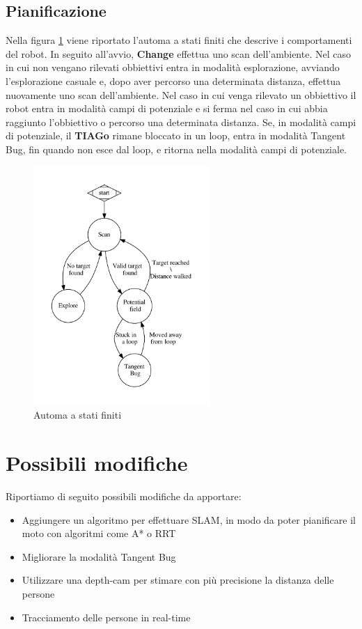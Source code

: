 \documentclass[a4paper]{article}
\begin{document}
	\subsection{Pianificazione}\label{subsec:Pianificazione}
	
	Nella figura \ref{fig:fsa} viene riportato l'automa a stati finiti che descrive i comportamenti del robot. In seguito all'avvio, \textbf{Change} effettua uno scan dell'ambiente. Nel caso in cui non vengano rilevati obbiettivi entra in modalità esplorazione, avviando l'esplorazione casuale e, dopo aver percorso una determinata distanza, effettua nuovamente uno scan dell'ambiente. Nel caso in cui venga rilevato un obbiettivo il robot entra in modalità campi di potenziale e si ferma nel caso in cui abbia raggiunto l'obbiettivo o percorso una determinata distanza. Se, in modalità campi di potenziale, il \textbf{TIAGo} rimane bloccato in un loop, entra in modalità Tangent Bug, fin quando non esce dal loop, e ritorna nella modalità campi di potenziale.
	
	\begin{figure}[H]
		\centering
		\includegraphics[width=0.6\textwidth]{./img/fsa.pdf}
		\caption{Automa a stati finiti }
		\label{fig:fsa}
	\end{figure}
	
	\section{Possibili modifiche}\label{sec:Possibli-modifiche}
	Riportiamo di seguito possibili modifiche da apportare:
	\begin{itemize}
	\item Aggiungere un algoritmo per effettuare SLAM, in modo da poter pianificare il moto con algoritmi come A* \cite{A*} o RRT \cite{RRT}
	\item Migliorare la modalità Tangent Bug
	\item Utilizzare una depth-cam per stimare con più precisione la distanza delle persone
	\item Tracciamento delle persone in real-time
	\end{itemize}
\end{document}
